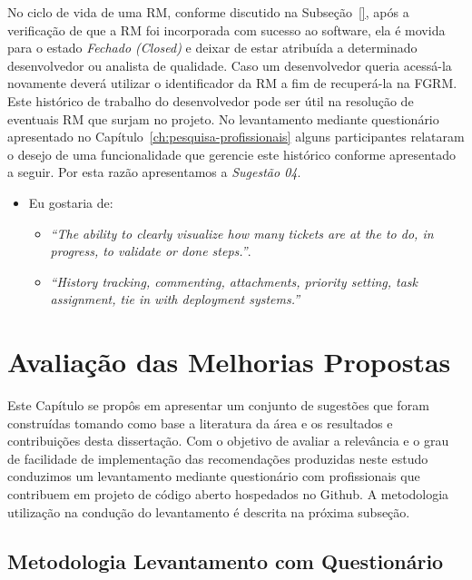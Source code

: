 No ciclo de vida de uma RM, conforme discutido na Subseção~\ref{}, após a
verificação de que a RM foi incorporada com sucesso ao software, ela é movida
para o estado \textit{Fechado (Closed)} e deixar de estar atribuída a
determinado desenvolvedor ou analista de qualidade. Caso um desenvolvedor queria
acessá-la novamente deverá utilizar o identificador da RM a fim de recuperá-la
na FGRM\@. Este histórico de trabalho do desenvolvedor pode ser útil na resolução
de eventuais RM que surjam no projeto. No levantamento mediante questionário
apresentado no Capítulo~\ref{ch:pesquisa-profissionais} alguns participantes
relataram o desejo de uma funcionalidade  que gerencie este histórico conforme
apresentado a seguir. Por esta razão apresentamos a \textit{Sugestão 04}.

\begin{itemize}
	\item Eu gostaria de:
	\begin{itemize}
		\item \textit{``The ability to clearly visualize how many tickets are at
				the to do, in progress, to validate or done steps.''}.
		\item \textit{``History tracking, commenting, attachments, priority
				setting, task assignment, tie in with deployment systems.''}
	\end{itemize}
\end{itemize}


\section{Avaliação das Melhorias Propostas}
\label{sec:sug_melhoria_avaliacao_das_melhorias}

Este Capítulo se propôs em apresentar um conjunto de sugestões que foram
construídas tomando como base a literatura da área e os resultados e
contribuições desta dissertação. Com o objetivo de avaliar a relevância e o grau
de facilidade de implementação das recomendações produzidas neste estudo
conduzimos um levantamento mediante questionário com profissionais que
contribuem em projeto de código aberto hospedados no Github. A metodologia
utilização na condução do levantamento é descrita na próxima subseção.

\subsection{Metodologia Levantamento com Questionário}
\label{sub:sug_melhoria_metodologia_levantamento}

